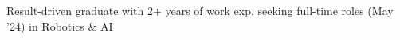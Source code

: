 




\vspace{6pt}

\begin{cvparagraph}
Result-driven graduate with 2+ years of work exp. seeking full-time roles (May '24) in Robotics \& AI
\end{cvparagraph}

\vspace{2pt}
